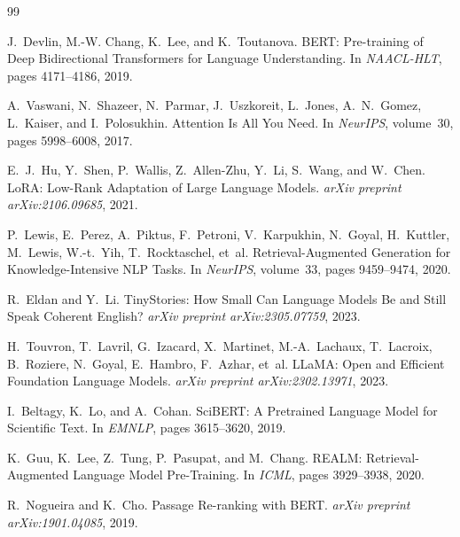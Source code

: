 \documentclass[11pt,a4paper]{article}
\theoremstyle{plain}
\theoremstyle{definition}
\begin{document}

\begin{thebibliography}{99}

J.~Devlin, M.-W. Chang, K.~Lee, and K.~Toutanova.
\newblock BERT: Pre-training of Deep Bidirectional Transformers for Language Understanding.
\newblock In \emph{NAACL-HLT}, pages 4171--4186, 2019.

A.~Vaswani, N.~Shazeer, N.~Parmar, J.~Uszkoreit, L.~Jones, A.~N.~Gomez, 
L.~Kaiser, and I.~Polosukhin.
\newblock Attention Is All You Need.
\newblock In \emph{NeurIPS}, volume~30, pages 5998--6008, 2017.

E.~J.~Hu, Y.~Shen, P.~Wallis, Z.~Allen-Zhu, Y.~Li, S.~Wang, and W.~Chen.
\newblock LoRA: Low-Rank Adaptation of Large Language Models.
\newblock \emph{arXiv preprint arXiv:2106.09685}, 2021.

P.~Lewis, E.~Perez, A.~Piktus, F.~Petroni, V.~Karpukhin, N.~Goyal, 
H.~Kuttler, M.~Lewis, W.-t.~Yih, T.~Rocktaschel, et~al.
\newblock Retrieval-Augmented Generation for Knowledge-Intensive NLP Tasks.
\newblock In \emph{NeurIPS}, volume~33, pages 9459--9474, 2020.

R.~Eldan and Y.~Li.
\newblock TinyStories: How Small Can Language Models Be and Still Speak Coherent English?
\newblock \emph{arXiv preprint arXiv:2305.07759}, 2023.

H.~Touvron, T.~Lavril, G.~Izacard, X.~Martinet, M.-A.~Lachaux, 
T.~Lacroix, B.~Roziere, N.~Goyal, E.~Hambro, F.~Azhar, et~al.
\newblock LLaMA: Open and Efficient Foundation Language Models.
\newblock \emph{arXiv preprint arXiv:2302.13971}, 2023.

I.~Beltagy, K.~Lo, and A.~Cohan.
\newblock SciBERT: A Pretrained Language Model for Scientific Text.
\newblock In \emph{EMNLP}, pages 3615--3620, 2019.

K.~Guu, K.~Lee, Z.~Tung, P.~Pasupat, and M.~Chang.
\newblock REALM: Retrieval-Augmented Language Model Pre-Training.
\newblock In \emph{ICML}, pages 3929--3938, 2020.

R.~Nogueira and K.~Cho.
\newblock Passage Re-ranking with BERT.
\newblock \emph{arXiv preprint arXiv:1901.04085}, 2019.


\end{thebibliography}
\end{document}
